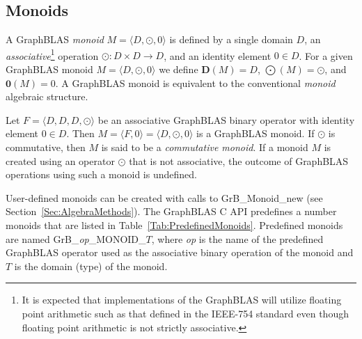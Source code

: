 \subsection{Monoids}

A GraphBLAS \emph{monoid} $M =
\langle D,\odot,0 \rangle$ is defined by a single domain $D$, an 
\emph{associative}\footnote{\label{Foot:associative}It is expected 
that implementations of the GraphBLAS will utilize floating point arithmetic 
such as that defined in the IEEE-754 standard even though
floating point arithmetic is not strictly associative.} 
operation $\odot: D \times D \rightarrow D$,
and an identity element $0 \in D$.  For a given GraphBLAS monoid $M=\langle
D,\odot,0 \rangle$ we define $\mathbf{D}(M) = D$, $\mathbf{\bigodot}(M) =
\odot$, and $\mathbf{0}(M) = 0$.  A GraphBLAS monoid is equivalent to 
the conventional \emph{monoid} algebraic structure.

Let $F = \langle D,D,D,\odot \rangle$ be an associative GraphBLAS binary operator
with identity element $0 \in D$.  Then $M = \langle F,0 \rangle = \langle
D,\odot,0 \rangle$ is a GraphBLAS monoid. If $\odot$ is commutative,
then $M$ is said to be a \emph{commutative monoid}.
If a monoid $M$ is created using an operator $\odot$ that is
not associative, the outcome of GraphBLAS operations using such a monoid is undefined.

User-defined monoids can be created with calls to {\sf GrB\_Monoid\_new} 
(see Section~\ref{Sec:AlgebraMethods}).
The GraphBLAS C API predefines a number monoids that are listed 
in Table~\ref{Tab:PredefinedMonoids}.  Predefined monoids are named {\sf
GrB\_\emph{op}\_MONOID\_$T$}, where \emph{op} is the name of the
predefined GraphBLAS operator used as the associative binary operation
of the monoid and $T$ is the domain (type) of the monoid.


